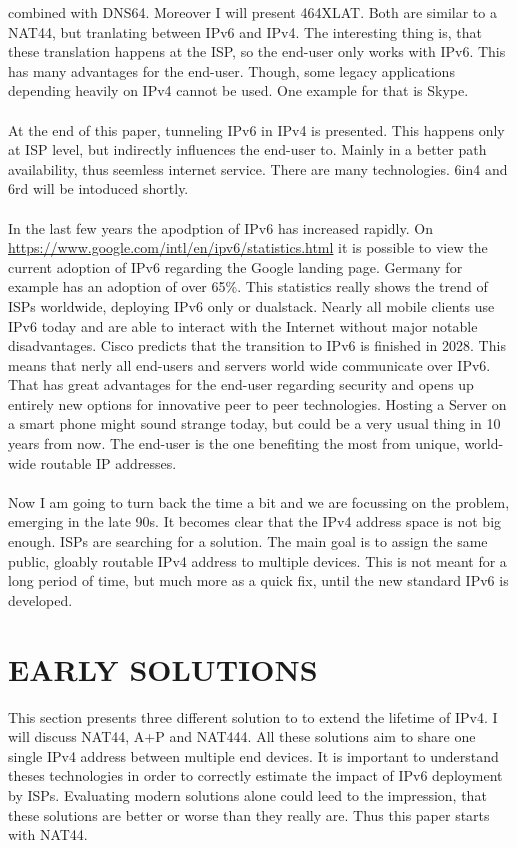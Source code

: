 \documentclass[format=sigconf, natbib=true, nonacm=true]{acmart}
\begin{document}
combined with DNS64. Moreover I will present 464XLAT. Both are similar to a NAT44, but tranlating between IPv6 and IPv4. The interesting thing is, that these translation happens at the ISP, so the end-user only works with IPv6. This has many advantages for the end-user. Though, some legacy applications depending heavily on IPv4 cannot be used. One example for that is Skype.\\\\At the end of this paper, tunneling IPv6 in IPv4 is presented. This happens only at ISP level, but indirectly influences the end-user to. Mainly in a better path availability, thus seemless internet service. There are many technologies. 6in4 and 6rd will be intoduced shortly.\\\\In the last few years the apodption of IPv6 has increased rapidly. On \url{https://www.google.com/intl/en/ipv6/statistics.html} it is possible to view the current adoption of IPv6 regarding the Google landing page. Germany for example has an adoption of over 65\%. This statistics really shows the trend of ISPs worldwide, deploying IPv6 only or dualstack. Nearly all mobile clients use IPv6 today and are able to interact with the Internet without major notable disadvantages. Cisco predicts that the transition to IPv6 is finished in 2028. This means that nerly all end-users and servers world wide communicate over IPv6. That has great advantages for the end-user regarding security and opens up entirely new options for innovative peer to peer technologies. Hosting a Server on a smart phone might sound strange today, but could be a very usual thing in 10 years from now. The end-user is the one benefiting the most from unique, world-wide routable IP addresses.\\\\Now I am going to turn back the time a bit and we are focussing on the problem, emerging in the late 90s. It becomes clear that the IPv4 address space is not big enough. ISPs are searching for a solution. The main goal is to assign the same public, gloably routable IPv4 address to multiple devices. This is not meant for a long period of time, but much more as a quick fix, until the new standard IPv6 is developed.
    
    \section{EARLY SOLUTIONS}
    This section presents three different solution to to extend the lifetime of IPv4. I will discuss NAT44, A+P and NAT444. All these solutions aim to share one single IPv4 address between multiple end devices. It is important to understand theses technologies in order to correctly estimate the impact of IPv6 deployment by ISPs. Evaluating modern solutions alone could leed to the impression, that these solutions are better or worse than they really are. Thus this paper starts with NAT44.
\end{document}
